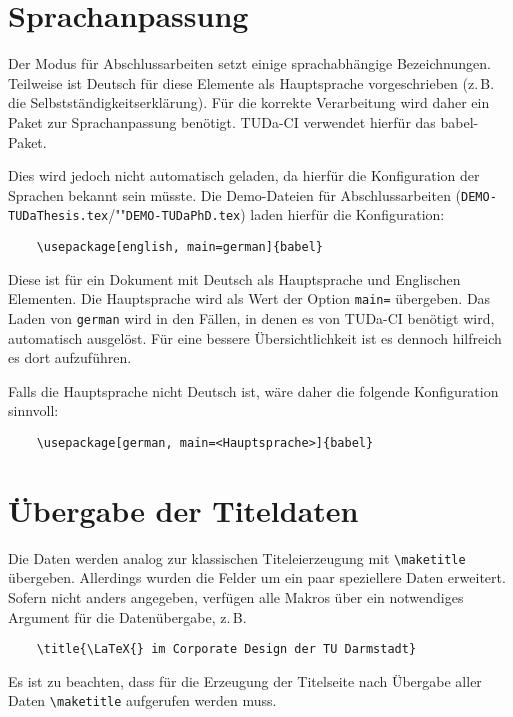 \documentclass[
	german,%
	accentcolor=9c,%
	ruledheaders=section,%
	class=report,%
	thesis={type=bachelor},%
	fontsize=11pt,%
	parskip=half-,%
	custommargins=true,%
	marginpar=false,%
]{tudapub}
\newcommand*{\file}[1]{\texttt{#1}}
\begin{document}
\section{Sprachanpassung}
Der Modus für Abschlussarbeiten setzt einige sprachabhängige Bezeichnungen.
Teilweise ist Deutsch für diese Elemente als Hauptsprache vorgeschrieben (z.\,B. die Selbstständigkeitserklärung). Für die korrekte Verarbeitung wird daher ein Paket zur Sprachanpassung benötigt.
TUDa-CI verwendet hierfür das babel-Paket.

Dies wird jedoch nicht automatisch geladen, da hierfür die Konfiguration der Sprachen bekannt sein müsste. Die Demo-Dateien für Abschlussarbeiten (\file{DEMO-TUDaThesis.tex}/""\file{DEMO-TUDaPhD.tex}) laden hierfür die Konfiguration:
\begin{verbatim}
    \usepackage[english, main=german]{babel}
\end{verbatim}
Diese ist für ein Dokument mit Deutsch als Hauptsprache und Englischen Elementen.
Die Hauptsprache wird als Wert der Option \verb+main=+ übergeben.
Das Laden von \verb+german+ wird in den Fällen, in denen es von TUDa-CI benötigt wird, automatisch ausgelöst.
Für eine bessere Übersichtlichkeit ist es dennoch hilfreich es dort aufzuführen.

Falls die Hauptsprache nicht Deutsch ist, wäre daher die folgende Konfiguration sinnvoll:
\begin{verbatim}
    \usepackage[german, main=<Hauptsprache>]{babel}
\end{verbatim}

\section{Übergabe der Titeldaten}

Die Daten werden analog zur klassischen Titeleierzeugung mit \verb+\maketitle+ übergeben. Allerdings wurden die Felder um ein paar speziellere Daten erweitert. Sofern nicht anders angegeben, verfügen alle Makros über ein notwendiges Argument für die Datenübergabe, z.\,B.
\begin{verbatim}
    \title{\LaTeX{} im Corporate Design der TU Darmstadt}
\end{verbatim}
Es ist zu beachten, dass für die Erzeugung der Titelseite nach Übergabe aller Daten \verb+\maketitle+ aufgerufen werden muss.
\end{document}
